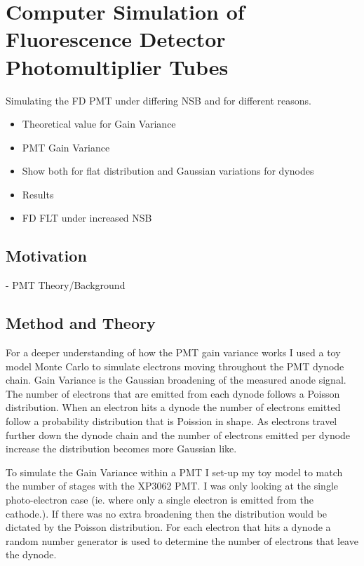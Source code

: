 \chapter[Computer Simulation of FD PMT]{\centering Computer Simulation of Fluorescence Detector Photomultiplier Tubes \\}\label{Ch:CompSimPMT}

Simulating the FD PMT under differing NSB and for different reasons.
\begin{itemize}
\item Theoretical value for Gain Variance
\item PMT Gain Variance
\item Show both for flat distribution and Gaussian variations for dynodes
\item Results
\item FD FLT under increased NSB
\end{itemize}

\section{Motivation}

- PMT Theory/Background

\section{Method and Theory}

For a deeper understanding of how the PMT gain variance works I used a toy model Monte Carlo to  simulate electrons moving throughout the PMT dynode chain. Gain Variance is the Gaussian broadening of the measured anode signal. The number of electrons that are emitted from each dynode follows a Poisson distribution.  When an electron hits a dynode the number of electrons emitted follow a probability distribution that is Poission in shape. As electrons travel further down the dynode chain and the number of electrons emitted per dynode increase the distribution becomes more Gaussian like.

To simulate the Gain Variance within a PMT I set-up my toy model to match the number of stages with the XP3062 PMT. I was only looking at the single photo-electron case (ie. where only a single electron is emitted from the cathode.). If there was no extra broadening then the distribution would be dictated by the Poisson distribution. For each electron that hits a dynode a random number generator is used to determine the number of electrons that leave the dynode.

